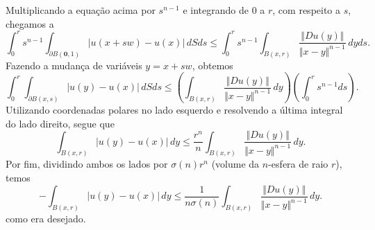 \documentclass[a4paper, 11pt]{book}
\theoremstyle{definition}
\newcommand{\bz}{\mathbf{0}}
\newcommand{\sint}{-\!\!\!\!\!\!\int}
\begin{document}
\begin{prf}
\[    \]
    Multiplicando a equação acima por $s^{n-1}$ e integrando de $0$ a $r$, com respeito a $s$, chegamos a
    \[
        \int_0^r s^{n-1} \int_{\partial B(\bz,1)} |u(x + sw) - u(x)| \,dSds \leqslant \int_0^r s^{n-1} \int_{B(x,r)} \frac{\Vert Du(y) \Vert}{\Vert x - y \Vert^{n-1}} \,dyds.
    \]
    Fazendo a mudança de variáveis $y = x + sw$, obtemos
    \[
        \int_0^r \int_{\partial B(x,s)} |u(y) - u(x)|\, dSds \leqslant \left( \int_{B(x,r)} \frac{\Vert Du(y) \Vert}{\Vert x - y \Vert^{n-1}} \,dy \right) \left( \int_0^r s^{n-1} ds \right).
    \]
    Utilizando coordenadas polares no lado esquerdo e resolvendo a última integral do lado direito, segue que
    \[
        \int_{B(x,r)} |u(y) - u(x)|\,dy \leqslant \frac{r^n}{n} \int_{B(x,r)} \frac{\Vert Du(y) \Vert}{\Vert x - y \Vert^{n-1}} \,dy.
    \]
    Por fim, dividindo ambos os lados por $\sigma(n) r^n$ (volume da $n$-esfera de raio $r$), temos
    \[
        \sint_{B(x,r)} |u(y) - u(x)| \,dy \leqslant \frac{1}{n\sigma(n)} \int_{B(x,r)} \frac{\Vert Du(y) \Vert}{\Vert x-y \Vert^{n-1}} \,dy.
    \]
    como era desejado.


\end{prf}
\end{document}
